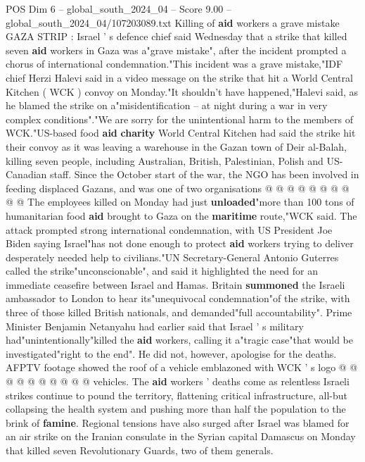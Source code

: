 \begin{textsample}{POS Dim 6 – global\_south\_2024\_04 – Score 9.00 – global\_south\_2024\_04/107203089.txt}  \label{ex:f6_pos_083}
Killing of \textbf{aid} workers a grave mistake GAZA STRIP : Israel ' s defence chief said Wednesday that a strike that killed seven \textbf{aid} workers in Gaza was a"grave mistake", after the incident prompted a chorus of international condemnation."This incident was a grave mistake,"IDF chief Herzi Halevi said in a video message on the strike that hit a World Central Kitchen ( WCK ) convoy on Monday."It shouldn't have happened,"Halevi said, as he blamed the strike on a"misidentification -- at night during a war in very complex conditions"."We are sorry for the unintentional harm to the members of WCK."US-based food \textbf{aid} \textbf{charity} World Central Kitchen had said the strike hit their convoy as it was leaving a warehouse in the Gazan town of Deir al-Balah, killing seven people, including Australian, British, Palestinian, Polish and US-Canadian staff.
Since the October start of the war, the NGO has been involved in feeding displaced Gazans, and was one of two organisations @ @ @ @ @ @ @ @ @ @ The employees killed on Monday had just \textbf{unloaded}"more than 100 tons of humanitarian food \textbf{aid} brought to Gaza on the \textbf{maritime} route,"WCK said.
The attack prompted strong international condemnation, with US President Joe Biden saying Israel"has not done enough to protect \textbf{aid} workers trying to deliver desperately needed help to civilians."UN Secretary-General Antonio Guterres called the strike"unconscionable", and said it highlighted the need for an immediate ceasefire between Israel and Hamas.
Britain \textbf{summoned} the Israeli ambassador to London to hear its"unequivocal condemnation"of the strike, with three of those killed British nationals, and demanded"full accountability".
Prime Minister Benjamin Netanyahu had earlier said that Israel ' s military had"unintentionally"killed the \textbf{aid} workers, calling it a"tragic case"that would be investigated"right to the end".
He did not, however, apologise for the deaths.
AFPTV footage showed the roof of a vehicle emblazoned with WCK ' s logo @ @ @ @ @ @ @ @ @ @ vehicles.
The \textbf{aid} workers ' deaths come as relentless Israeli strikes continue to pound the territory, flattening critical infrastructure, all-but collapsing the health system and pushing more than half the population to the brink of \textbf{famine}.
Regional tensions have also surged after Israel was blamed for an air strike on the Iranian consulate in the Syrian capital Damascus on Monday that killed seven Revolutionary Guards, two of them generals.

\end{textsample}

